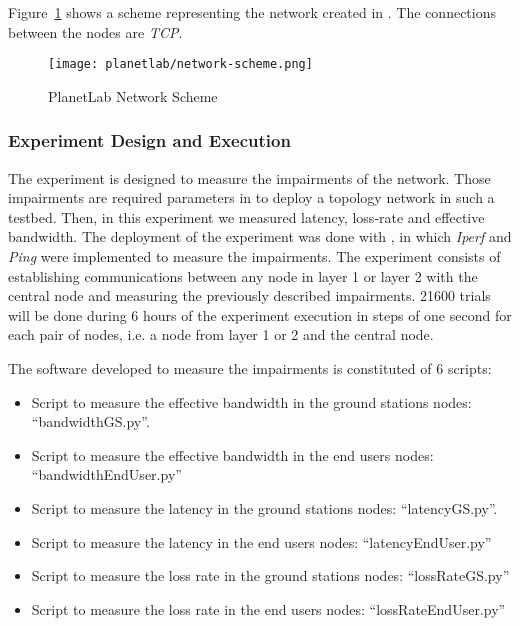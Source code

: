 %   


Figure~\ref{fig:ple-network-scheme} shows a scheme representing the network created in \pl. The
connections between the nodes are \emph{TCP}.

\begin{figure}[!h]
\begin{center}
\texttt{[image: planetlab/network-scheme.png]}

\caption{PlanetLab Network Scheme}
\label{fig:ple-network-scheme}
\end{center}
\end{figure}

\subsubsection{Experiment Design and Execution}

The experiment is designed to measure the impairments of the network. Those impairments are required parameters in \vw to deploy a topology network in such a testbed. Then, in this experiment we measured latency, loss-rate and effective bandwidth. The deployment of the experiment was done with \nepi, in which \emph{Iperf} and \emph{Ping} were implemented to measure the impairments. The experiment consists of establishing communications between any node in layer 1 or layer 2 with the central node and measuring the previously described impairments. 21600 trials will be done during 6 hours of the experiment execution in steps of one second for each pair of nodes, i.e. a node from layer 1 or 2 and the central node.

The software developed to measure the impairments is constituted of 6 scripts:
\begin{itemize}
\item Script to measure the effective bandwidth in the ground stations nodes: “bandwidthGS.py”.
\item Script to measure the effective bandwidth in the end users nodes: “bandwidthEndUser.py”
\item Script to measure the latency in the ground stations nodes: “latencyGS.py”.
\item Script to measure the latency  in the end users nodes: “latencyEndUser.py”
\item Script to measure the loss rate in the ground stations nodes: “lossRateGS.py”
\item Script to measure the loss rate in the end users nodes:
  “lossRateEndUser.py”

\end{itemize}


